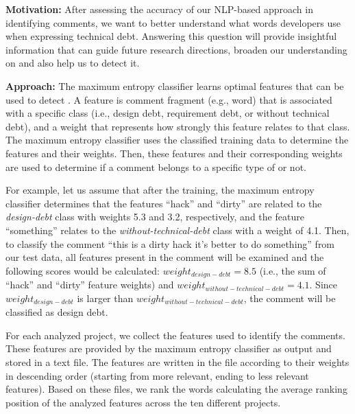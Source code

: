 \vspace{3mm}
\noindent\chapterIVrqii
\vspace{3mm}

\noindent \textbf{Motivation:} After assessing the accuracy of our NLP-based approach in identifying \SATD comments, we want to better understand what words developers use when expressing technical debt. Answering this question will provide insightful information that can guide future research directions, broaden our understanding on \SATD and also help us to detect it.     

\vspace{1mm}
\noindent \textbf{Approach:} The maximum entropy classifier learns optimal features that can be used to detect \SATD. A feature is comment fragment (e.g., word) that is associated with a specific class (i.e., design debt, requirement debt, or without technical debt), and a weight that represents how strongly this feature relates to that class. The maximum entropy classifier uses the classified training data to determine the features and their weights. Then, these features and their corresponding weights are used to determine if a comment belongs to a specific type of \SATD or not.

For example, let us assume that after the training, the maximum entropy classifier determines that the features ``hack'' and ``dirty'' are related to the \textit{design-debt} class with weights 5.3 and 3.2, respectively, and the feature ``something'' relates to the \textit{without-technical-debt} class with a weight of 4.1. Then, to classify the comment ``this is a dirty hack it's better to do something'' from our test data, all features present in the comment will be examined and the following scores would be calculated: $weight_{design-debt}=8.5$ (i.e., the sum of ``hack'' and ``dirty'' feature weights) and  $weight_{without-technical-debt}=4.1$.
Since $weight_{design-debt}$ is larger than $weight_{without-technical-debt}$, the comment will be classified as design debt.

For each analyzed project, we collect the features used to identify the \SATD comments. These features are provided by the maximum entropy classifier as output and stored in a text file. The features are written in the file according to their weights in descending order (starting from more relevant, ending to less relevant features). Based on these files, we rank the words calculating the average ranking position of the analyzed features across the ten different projects. 

